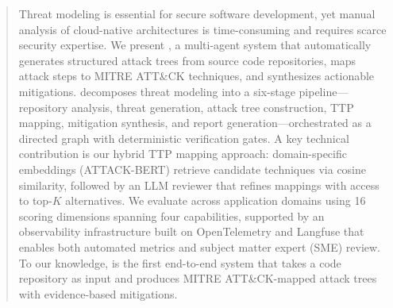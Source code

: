 \begin{abstract}
Threat modeling is essential for secure software development, yet manual analysis of cloud-native architectures is time-consuming and requires scarce security expertise. We present \threatforest{}, a multi-agent system that automatically generates structured attack trees from source code repositories, maps attack steps to MITRE ATT\&CK techniques, and synthesizes actionable mitigations. \threatforest{} decomposes threat modeling into a six-stage pipeline---repository analysis, threat generation, attack tree construction, TTP mapping, mitigation synthesis, and report generation---orchestrated as a directed graph with deterministic verification gates. A key technical contribution is our hybrid TTP mapping approach: domain-specific embeddings (ATTACK-BERT) retrieve candidate techniques via cosine similarity, followed by an LLM reviewer that refines mappings with access to top-$K$ alternatives. We evaluate \threatforest{} across  application domains using 16 scoring dimensions spanning four capabilities, supported by an observability infrastructure built on OpenTelemetry and Langfuse that enables both automated metrics and subject matter expert (SME) review.  To our knowledge, \threatforest{} is the first end-to-end system that takes a code repository as input and produces MITRE ATT\&CK-mapped attack trees with evidence-based mitigations.
\end{abstract}
